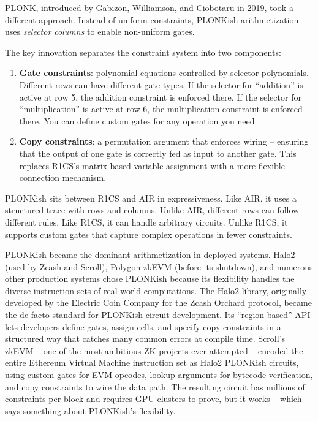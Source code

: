 \documentclass[
  11pt,
  openany]{report}
\renewcommand{\textbf}[1]{{\bfseries\color{MidnightBold}#1}}
\begin{document}
PLONK, introduced by Gabizon, Williamson, and Ciobotaru in 2019, took a
different approach. Instead of uniform constraints, PLONKish arithmetization
uses \emph{selector columns} to enable non-uniform gates.

The key innovation separates the constraint system into two components:

\begin{enumerate}
\def\labelenumi{\arabic{enumi}.}
\item
  \textbf{Gate constraints}: polynomial equations controlled by selector
  polynomials. Different rows can have different gate types. If the selector for
  ``addition'' is active at row 5, the addition constraint is enforced there. If
  the selector for ``multiplication'' is active at row 6, the multiplication
  constraint is enforced there. You can define custom gates for any operation
  you need.
\item
  \textbf{Copy constraints}: a permutation argument that enforces wiring --
  ensuring that the output of one gate is correctly fed as input to another
  gate. This replaces R1CS's matrix-based variable assignment with a more
  flexible connection mechanism.
\end{enumerate}

PLONKish sits between R1CS and AIR in expressiveness. Like AIR, it uses a
structured trace with rows and columns. Unlike AIR, different rows can follow
different rules. Like R1CS, it can handle arbitrary circuits. Unlike R1CS, it
supports custom gates that capture complex operations in fewer constraints.

PLONKish became the dominant arithmetization in deployed systems. Halo2 (used by
Zcash and Scroll), Polygon zkEVM (before its shutdown), and numerous other
production systems chose PLONKish because its flexibility handles the diverse
instruction sets of real-world computations. The Halo2 library, originally
developed by the Electric Coin Company for the Zcash Orchard protocol, became
the de facto standard for PLONKish circuit development. Its ``region-based'' API
lets developers define gates, assign cells, and specify copy constraints in a
structured way that catches many common errors at compile time. Scroll's zkEVM
-- one of the most ambitious ZK projects ever attempted -- encoded the entire
Ethereum Virtual Machine instruction set as Halo2 PLONKish circuits, using
custom gates for EVM opcodes, lookup arguments for bytecode verification, and
copy constraints to wire the data path. The resulting circuit has millions of
constraints per block and requires GPU clusters to prove, but it works -- which
says something about PLONKish's flexibility.
\end{document}
